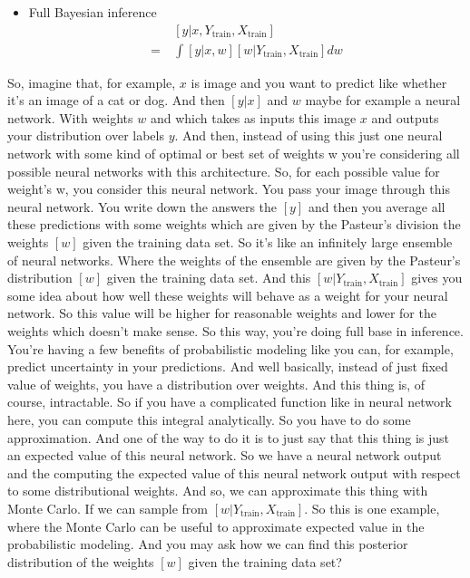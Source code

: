 \documentclass[11pt, oneside, reqno]{amsart}
\numberwithin{equation}{section}
\theoremstyle{plain}%
\theoremstyle{definition}
\theoremstyle{remark}
\begin{document}
 \begin{itemize}
 	\item Full Bayesian inference
\begin{align*}
&\	[y|x,Y_{\text{train}},X_{\text{train}}]\\
=&\ \int [y|x,w][w|Y_{\text{train}},X_{\text{train}}]dw
\end{align*}
 \end{itemize}
 
  So, imagine that, for example, $x$ is image and you want to predict like whether it's an image of a cat or dog. And then $[y|x]$ and $w$ maybe for example a neural network. With weights $w$ and which takes as inputs this image $x$ and outputs your distribution over labels $y$. And then, instead of using this just one neural network with some kind of optimal or best set of weights w you're considering all possible neural networks with this architecture. So, for each possible value for weight's w, you consider this neural network. You pass your image through this neural network. You write down the answers the $[y]$ and then you average all these predictions with some weights which are given by the Pasteur's division the weights $[w]$ given the training data set. So it's like an infinitely large ensemble of neural networks. Where the weights of the ensemble are given by the Pasteur's distribution $[w]$ given the training data set. And this $[w|Y_{\text{train}},X_{\text{train}}]$ gives you some idea about how well these weights will behave as a weight for your neural network. So this value will be higher for reasonable weights and lower for the weights which doesn't make sense. So this way, you're doing full base in inference. You're having a few benefits of probabilistic modeling like you can, for example, predict uncertainty in your predictions. And well basically, instead of just fixed value of weights, you have a distribution over weights. And this thing is, of course, intractable. So if you have a complicated function like in neural network here, you can compute this integral analytically. So you have to do some approximation. And one of the way to do it is to just say that this thing is just an expected value of this neural network. So we have a neural network output and the computing the expected value of this neural network output with respect to some distributional weights. And so, we can approximate this thing with Monte Carlo. If we can sample from $[w|Y_{\text{train}},X_{\text{train}}]$. So this is one example, where the Monte Carlo can be useful to approximate expected value in the probabilistic modeling. And you may ask how we can find this posterior distribution of the weights $[w]$ given the training data set? 
  
\end{document}
